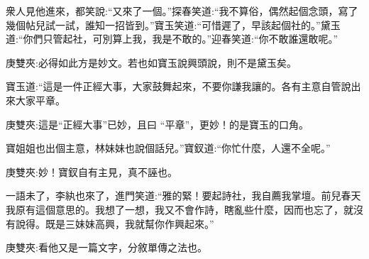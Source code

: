 \begin{parag}
    衆人見他進來，都笑說:“又來了一個。”探春笑道:“我不算俗，偶然起個念頭，寫了幾個帖兒試一試，誰知一招皆到。”寶玉笑道:“可惜遲了，早該起個社的。”黛玉道:“你們只管起社，可別算上我，我是不敢的。”迎春笑道:“你不敢誰還敢呢。”\begin{note}庚雙夾:必得如此方是妙文。若也如寶玉說興頭說，則不是黛玉矣。\end{note}寶玉道:“這是一件正經大事，大家鼓舞起來，不要你謙我讓的。各有主意自管說出來大家平章。\begin{note}庚雙夾:這是“正經大事”已妙，且曰 “平章”，更妙！的是寶玉的口角。\end{note}寶姐姐也出個主意，林妹妹也說個話兒。”寶釵道:“你忙什麼，人還不全呢。”\begin{note}庚雙夾:妙！寶釵自有主見，真不誣也。\end{note}一語未了，李紈也來了，進門笑道:“雅的緊！要起詩社，我自薦我掌壇。前兒春天我原有這個意思的。我想了一想，我又不會作詩，瞎亂些什麼，因而也忘了，就沒有說得。既是三妹妹高興，我就幫你作興起來。”\begin{note}庚雙夾:看他又是一篇文字，分敘單傳之法也。\end{note}
\end{parag}


